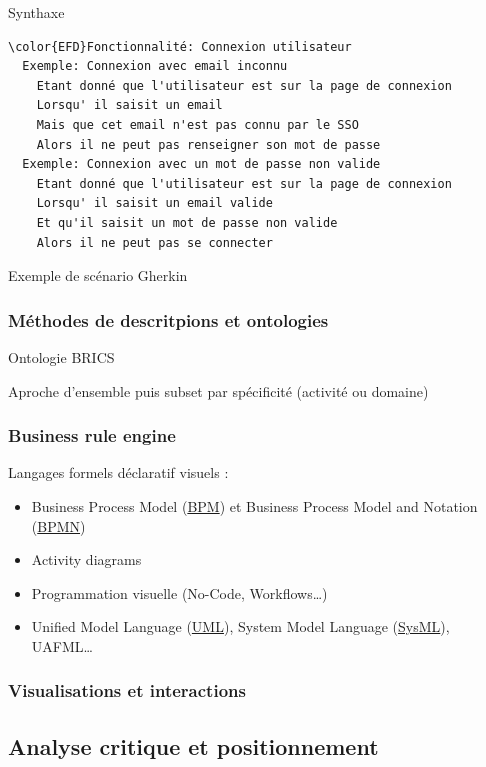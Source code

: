 \documentclass[a4paper,12pt]{article}
\begin{document}
Synthaxe

\begin{listing}[htbp]
\begin{Code}
\begin{Verbatim}
\color{EFD}Fonctionnalité: Connexion utilisateur
  Exemple: Connexion avec email inconnu
    Etant donné que l'utilisateur est sur la page de connexion
    Lorsqu' il saisit un email
    Mais que cet email n'est pas connu par le SSO
    Alors il ne peut pas renseigner son mot de passe
  Exemple: Connexion avec un mot de passe non valide
    Etant donné que l'utilisateur est sur la page de connexion
    Lorsqu' il saisit un email valide
    Et qu'il saisit un mot de passe non valide
    Alors il ne peut pas se connecter
\end{Verbatim}
\end{Code}
\caption{\label{lst:orgf85acf2}Exemple de scénario Gherkin}
\end{listing}
\subsubsection{Méthodes de descritpions et ontologies}
\label{sec:org941ca41}
Ontologie BRICS

Aproche d'ensemble puis subset par spécificité (activité ou domaine)
\subsubsection{Business rule engine}
\label{sec:org509c3b2}
Langages formels déclaratif visuels : 
\begin{itemize}
\item Business Process Model
 (\protect\hyperlink{gls-6}{\label{gls-6-use-1}BPM}) et Business Process Model and Notation
 (\protect\hyperlink{gls-7}{\label{gls-7-use-1}BPMN})
\item Activity diagrams
\item Programmation visuelle (No-Code, Workflows\ldots{})
\item Unified Model Language
 (\protect\hyperlink{gls-8}{\label{gls-8-use-1}UML}), System Model Language
 (\protect\hyperlink{gls-9}{\label{gls-9-use-1}SysML}), UAFML…
\end{itemize}
\subsubsection{Visualisations et interactions}
\label{sec:orgd85c678}
\subsection{Analyse critique et positionnement}
\label{sec:org024796f}
\end{document}
